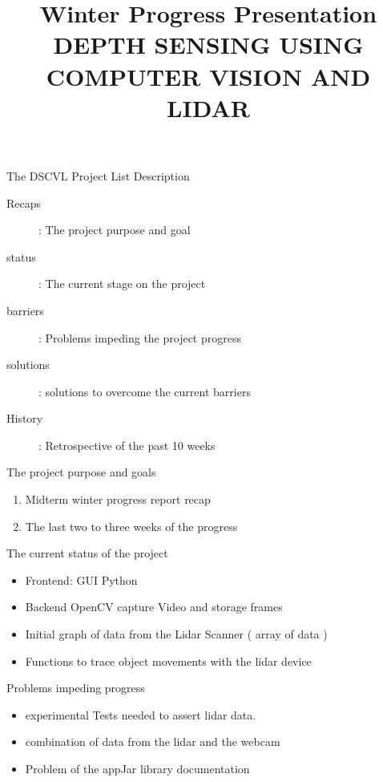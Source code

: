 \documentclass{beamer}
\title[]{\Large Winter Progress Presentation\\\vspace{1 in}
		\textbf{DEPTH SENSING USING COMPUTER VISION AND LIDAR}\\\vspace{10pt}}
\institute{Oregon State University}
\date{\displaydate{date}}
\begin{document}
\begin{frame}
\titlepage
\end{frame}

\begin{frame}[t]{ The  DSCVL Project List Description } \vspace{.5in}
\begin{description}
\item [Recaps]: The project purpose and goal
\item [status]: The current stage on the project
\item [barriers]: Problems  impeding the project progress
\item [solutions]: solutions to overcome the current barriers
\item [History]: Retrospective of the past 10 weeks
\end{description}
\end{frame}


\begin{frame}[t]{The project purpose and goals}\vspace{1in}

\begin{enumerate}

\item \large Midterm winter progress report recap 
	   
\item\large The last two to three weeks of the progress

\end{enumerate}
\end{frame}

\begin{frame}[t]{The  current status of the project}\vspace{.5in}
\begin{itemize}
\item Frontend: GUI Python 
\item Backend OpenCV capture Video and storage frames 
\item Initial graph of data from the Lidar Scanner ( array of data ) 
\item Functions to trace object movements with the lidar device
\end{itemize}
\end{frame}



\begin{frame}[t]{Problems impeding progress}\vspace{.5in}
\begin{itemize}
\item experimental  Tests needed to assert lidar data.
\item combination of data from the lidar and the webcam
\item  Problem of the  appJar  library documentation 
\end{itemize}
\end{frame}
\end{document}
